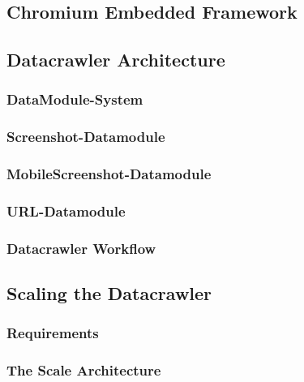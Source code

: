 \subsection{Chromium Embedded Framework}
\label{datacrawler_framework_language}

\subsection{Datacrawler Architecture}
\label{datacrawler_architecture}

\subsubsection{DataModule-System}
\label{datacrawler_datamodulesystem}

\subsubsection{Screenshot-Datamodule}
\label{datacrawler_screenshot_datamodule}

\subsubsection{MobileScreenshot-Datamodule}
\label{datacrawler_mobilescreenshot_datamodule}

\subsubsection{URL-Datamodule}
\label{datacrawler_url_datamodule}


\subsubsection{Datacrawler Workflow}
\label{datacrawler_workflow}

\subsection{Scaling the Datacrawler}
\label{datacrawler_scale}

\subsubsection{Requirements}
\label{datacrawler_scale_requirements}

\subsubsection{The Scale Architecture}
\label{datacrawler_scale_architecture}


